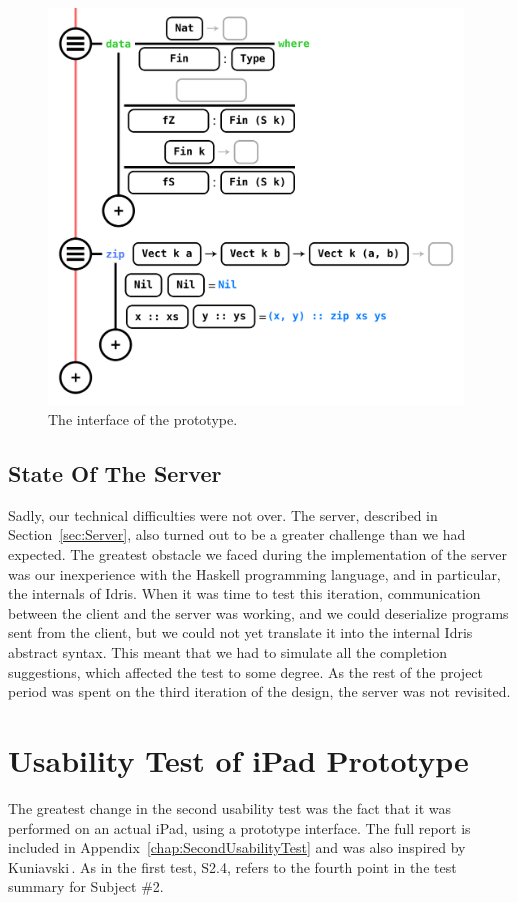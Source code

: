 \begin{figure}
	\centering
		\includegraphics[width=110mm]{diagrams/ipad_interface.PNG}
	\caption{The interface of the prototype.}
\label{fig:initialiPadInterface}
\end{figure}

\subsection{State Of The Server}
\label{subsec:state_of_the_server}
Sadly, our technical difficulties were not over. The server, described in Section~\ref{sec:Server}, also turned out to be a greater challenge than we had expected.
The greatest obstacle we faced during the implementation of the server was our inexperience with the Haskell programming language, and in particular, the internals of Idris.
When it was time to test this iteration, communication between the client and the server was working, and we could deserialize programs sent from the client, but we could not yet translate it into the internal Idris abstract syntax.
This meant that we had to simulate all the completion suggestions, which affected the test to some degree.
As the rest of the project period was spent on the third iteration of the design, the server was not revisited.

\section{Usability Test of iPad Prototype}
\label{sec:SecondUsabilityTest}
The greatest change in the second usability test was the fact that it was
performed on an actual iPad, using a prototype interface. The full report is
included in Appendix~\ref{chap:SecondUsabilityTest} and was also inspired by Kuniavski\,\cite{kuniavsky2003observing}. As in the first test, S2.4, refers to
the fourth point in the test summary for Subject \#2.

